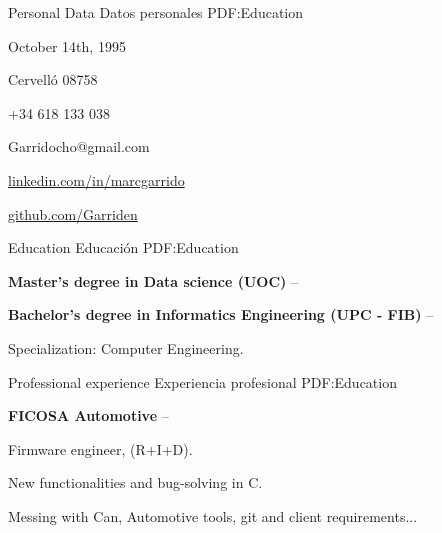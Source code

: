 \documentclass[letterpaper,MMMyyyy,nonstopmode]{simpleresumecv}
\newcommand\tab[1][0.5cm]{\hspace*{#1}}
\begin{document}
\begin{Body}

\Gap
\Gap
\Gap

\Section
{Personal Data}
{Datos personales}
{PDF:Education}

\Entry

\large{October 14th, 1995}

{Cervelló 08758}

{+34 618 133 038}

{Garridocho@gmail.com}

\href{https://www.linkedin.com/in/marcgarrido}{linkedin.com/in/marcgarrido}

\href{https://www.github.com/Garriden}{github.com/Garriden}


\Gap




\Section
{Education}
{Educación}
{PDF:Education}

\Entry

{\textbf{Master's degree in Data science (UOC)}}
\hfill
{} --


\Gap


{\textbf{Bachelor's degree in Informatics Engineering (UPC - FIB)}}
\hfill
{} --

\tab Specialization: Computer Engineering.


\Gap



\Section
{Professional experience}
{Experiencia profesional}
{PDF:Education}

\Entry



{\textbf{FICOSA Automotive}}
\hfill
{} --

\tab Firmware engineer, (R+I+D). 

\tab New functionalities and bug-solving in C. 

\tab Messing with Can, Automotive tools, git and  client requirements...


\end{Body}
\end{document}
